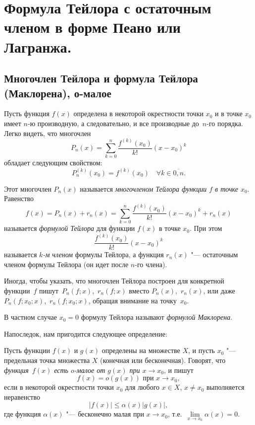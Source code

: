 \chapter{Формула Тейлора с остаточным членом в форме Пеано или Лагранжа.}

\section{Многочлен Тейлора и формула Тейлора (Маклорена), о-малое}

Пусть функция $f(x)$ определена в некоторой окрестности точки $x_0$ и в точке $x_0$ имеет $n$-ю производную, а следовательно, и все производные до~$n$-го порядка. Легко видеть, что многочлен
$$
P_n(x) = \sum_{k = 0}^{n} \frac{f^{(k)}(x_0)}{k!} (x - x_0)^k
$$
обладает следующим свойством:
$$
P_n^{(k)}(x_0) = f^{(k)}(x_0) \quad \forall k \in \overline{0,n}.
$$

\begin{defn}
Этот многочлен $P_n(x)$ называется \textit{многочленом Тейлора функции $f$ в точке $x_0$}. Равенство $$
f(x) = P_n(x) + r_n(x) = \sum_{k = 0}^{n} \frac{f^{(k)}(x_0)}{k!} (x - x_0)^k + r_n(x)
$$ 
называется \textit{формулой Тейлора} для функции $f(x)$ в точке $x_0$. При этом $$\frac{f^{(k)}(x_0)}{k!} (x - x_0)^k$$ называется \textit{$k$-м членом} формулы Тейлора, а функция $r_n(x)$ "--- остаточным членом формулы Тейлора (он идет после $n$-го члена).
\end{defn}

Иногда, чтобы указать, что многочлен Тейлора построен для конкретной функции~$f$ пишут~$P_n(f;x)$,~$r_n(f;x)$ вместо $P_n(x)$,~$r_n(x)$, или даже $P_n(f;x_0;x)$,~$r_n(f;x_0;x)$, обращая внимание на точку~$x_0$.

В частном случае $x_0=0$ формулу Тейлора называют \textit{формулой Маклорена}.

Напоследок, нам пригодится следующее определение:
\begin{defn}
Пусть функции $f(x)$ и $g(x)$ определены на множестве $X$, и пусть $x_0$ "--- предельная точка множества $X$ (конечная или бесконечная). Говорят, что \textit{функция~$f(x)$ есть $o$-малое от $g(x)$ при $x\to x_0$}, и пишут
$$
f(x) = o(g(x)) \text{ при } x\to x_0,
$$ 
если в некоторой окрестности точки $x_0$ для любого $x \in X$, $x\ne x_0$ выполняется неравенство\footnotemark
$$
|f(x)| \le \alpha(x)|g(x)|,
$$
где функция $\alpha(x)$ "--- бесконечно малая при $x\to x_0$, т.е.~$\lim\limits_{x\to x_0}\alpha(x)= 0$.
\end{defn}

